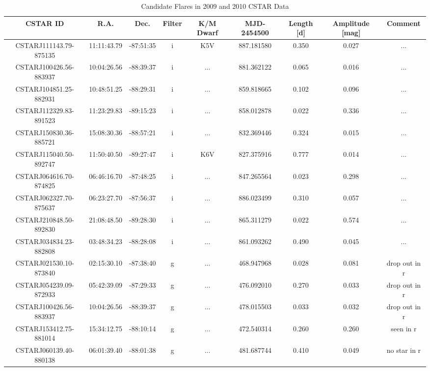\begin{landscape}
\begin{table}[H]
\centering
\tiny
\caption{Candidate Flares in 2009 and 2010 CSTAR Data}
\begin{tabular}{ccccccccc}
\hline
CSTAR ID & R.A. & Dec. & Filter & K/M Dwarf & MJD-2454500 & Length [d] & Amplitude [mag] & Comment \\
\hline
CSTARJ111143.79-875135 & 11:11:43.79 & -87:51:35 & i & K5V & 887.181580 & 0.350 & 0.027 &            ... \\
CSTARJ100426.56-883937 & 10:04:26.56 & -88:39:37 & i & ... & 881.362122 & 0.065 & 0.016 &            ... \\
CSTARJ104851.25-882931 & 10:48:51.25 & -88:29:31 & i & ... & 859.818665 & 0.102 & 0.096 &            ... \\
CSTARJ112329.83-891523 & 11:23:29.83 & -89:15:23 & i & ... & 858.012878 & 0.022 & 0.336 &            ... \\
CSTARJ150830.36-885721 & 15:08:30.36 & -88:57:21 & i & ... & 832.369446 & 0.324 & 0.015 &            ... \\
CSTARJ115040.50-892747 & 11:50:40.50 & -89:27:47 & i & K6V & 827.375916 & 0.777 & 0.014 &            ... \\
CSTARJ064616.70-874825 & 06:46:16.70 & -87:48:25 & i & ... & 847.265564 & 0.023 & 0.298 &            ... \\
CSTARJ062327.70-875637 & 06:23:27.70 & -87:56:37 & i & ... & 886.023499 & 0.310 & 0.057 &            ... \\
CSTARJ210848.50-892830 & 21:08:48.50 & -89:28:30 & i & ... & 865.311279 & 0.022 & 0.574 &            ... \\
CSTARJ034834.23-882808 & 03:48:34.23 & -88:28:08 & i & ... & 861.093262 & 0.490 & 0.045 &            ... \\
CSTARJ021530.10-873840 & 02:15:30.10 & -87:38:40 & g & ... & 468.947968 & 0.028 & 0.081 &  drop out in r \\
CSTARJ054239.09-872933 & 05:42:39.09 & -87:29:33 & g & ... & 476.092010 & 0.270 & 0.033 &  drop out in r \\
CSTARJ100426.56-883937 & 10:04:26.56 & -88:39:37 & g & ... & 478.015503 & 0.033 & 0.032 &  drop out in r \\
CSTARJ153412.75-881014 & 15:34:12.75 & -88:10:14 & g & ... & 472.540314 & 0.260 & 0.260 &      seen in r \\
CSTARJ060139.40-880138 & 06:01:39.40 & -88:01:38 & g & ... & 481.687744 & 0.410 & 0.049 &   no star in r \\

\end{tabular}
\end{table}
\end{landscape}
